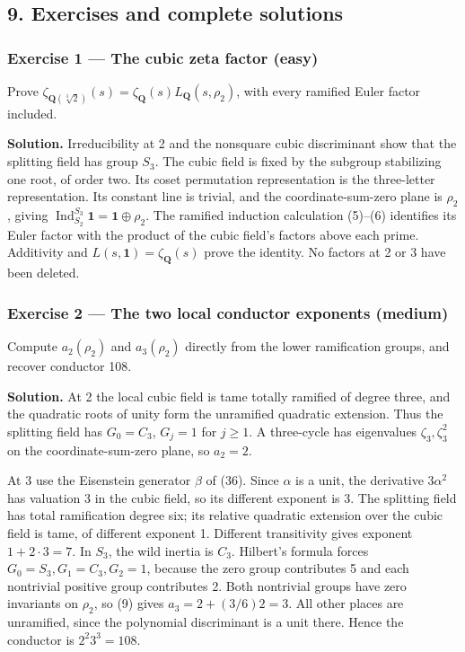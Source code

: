 \documentclass[11pt,a4paper]{article}
\begin{document}
\subsection{9. Exercises and complete
solutions}\label{exercises-and-complete-solutions}

\subsubsection{Exercise 1 --- The cubic zeta factor
(easy)}\label{exercise-1-the-cubic-zeta-factor-easy}

Prove
\(\zeta_{\mathbf Q(\sqrt[3]2)}(s)=\zeta_{\mathbf Q}(s)L_{\mathbf Q}(s,\rho_2)\),
with every ramified Euler factor included.

\textbf{Solution.} Irreducibility at 2 and the nonsquare cubic
discriminant show that the splitting field has group \(S_3\). The cubic
field is fixed by the subgroup stabilizing one root, of order two. Its
coset permutation representation is the three-letter representation. Its
constant line is trivial, and the coordinate-sum-zero plane is
\(\rho_2\), giving
\(\operatorname{Ind}_{S_2}^{S_3}\mathbf1=\mathbf1\oplus\rho_2\). The
ramified induction calculation (5)--(6) identifies its Euler factor with
the product of the cubic field's factors above each prime. Additivity
and \(L(s,\mathbf1)=\zeta_{\mathbf Q}(s)\) prove the identity. No
factors at 2 or 3 have been deleted.

\subsubsection{Exercise 2 --- The two local conductor exponents
(medium)}\label{exercise-2-the-two-local-conductor-exponents-medium}

Compute \(a_2(\rho_2)\) and \(a_3(\rho_2)\) directly from the lower
ramification groups, and recover conductor 108.

\textbf{Solution.} At 2 the local cubic field is tame totally ramified
of degree three, and the quadratic roots of unity form the unramified
quadratic extension. Thus the splitting field has \(G_0=C_3\), \(G_j=1\)
for \(j\geq1\). A three-cycle has eigenvalues \(\zeta_3,\zeta_3^2\) on
the coordinate-sum-zero plane, so \(a_2=2\).

At 3 use the Eisenstein generator \(\beta\) of (36). Since \(\alpha\) is
a unit, the derivative \(3\alpha^2\) has valuation 3 in the cubic field,
so its different exponent is 3. The splitting field has total
ramification degree six; its relative quadratic extension over the cubic
field is tame, of different exponent 1. Different transitivity gives
exponent \(1+2\cdot3=7\). In \(S_3\), the wild inertia is \(C_3\).
Hilbert's formula forces \(G_0=S_3,G_1=C_3,G_2=1\), because the zero
group contributes 5 and each nontrivial positive group contributes 2.
Both nontrivial groups have zero invariants on \(\rho_2\), so (9) gives
\(a_3=2+(3/6)2=3\). All other places are unramified, since the
polynomial discriminant is a unit there. Hence the conductor is
\(2^2 3^3=108\).
\end{document}
